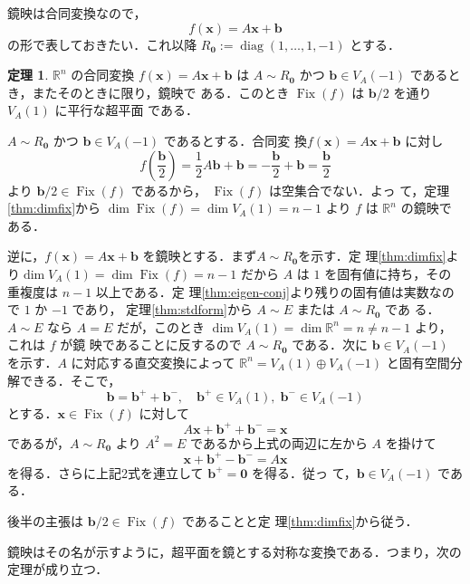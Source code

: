 \documentclass[11pt, uplatex, dvipdfmx, titlepage]{jsarticle}
\makeatletter
\DeclareMathOperator{\Fix}{Fix}
\DeclareMathOperator{\diag}{diag}
\renewenvironment{proof}[1][\proofname]{\par
  \pushQED{\qed}%
  \normalfont \topsep6\p@\@plus6\p@\relax
  \trivlist
  \item[\hskip\labelsep
         \bfseries
    {#1}]\ignorespaces
}{%
  \popQED\endtrivlist\@endpefalse
}
\theoremstyle{definition}
\newtheorem{theorem}{定理}[section]
\renewcommand{\proofname}{\textbf{証明}}
\makeatother
\begin{document}
鏡映は合同変換なので，
\[
  f(\bm{x}) = A\bm{x} + \bm{b}
\]
の形で表しておきたい．これ以降 $R_{\bm{0}} := \diag(1, \ldots, 1, -1)$ とする．

\begin{theorem}\label{thm:refconcrete}
  $\mathbb{R}^n$ の合同変換 $f(\bm{x}) = A\bm{x} + \bm{b}$ は $A \sim
  R_{\bm{0}}$ かつ $\bm{b} \in V_A(-1)$ であるとき，またそのときに限り，鏡映で
  ある．このとき $\Fix(f)$ は $\bm{b}/2$ を通り $V_A(1)$ に平行な超平面
  である．
\end{theorem}

\begin{proof}
  $A\sim R_{\bm{0}}$ かつ $\bm{b} \in V_A(-1)$ であるとする．合同変
  換$f(\bm{x}) = A \bm{x} + \bm{b}$ に対し
  \[
    f\left( \frac{\bm{b}}{2}\right) = \frac{1}{2} A \bm{b} + \bm{b} 
    =-\frac{\bm{b}}{2} + \bm{b} =\frac{\bm{b}}{2} 
  \]
  より $\bm{b}/2 \in \Fix(f)$ であるから， $\Fix(f)$ は空集合でない．よっ
  て，定理\ref{thm:dimfix}から $\dim \Fix(f) = \dim V_A(1) =
  n-1$ より $f$ は $\mathbb{R}^n$ の鏡映である．

  逆に，$f(\bm{x}) = A\bm{x} + \bm{b}$
  を鏡映とする．まず$A \sim R_{\bm{0}}$を示す．定
  理\ref{thm:dimfix}より$\dim V_A(1) = \dim \Fix(f) = n-1$ だから $A$
  は $1$ を固有値に持ち，その重複度は $n-1$ 以上である．定
  理\ref{thm:eigen-conj}より残りの固有値は実数なので $1$ か $-1$ であり，
  定理\ref{thm:stdform}から $A \sim E$ または $A \sim R_{\bm{0}}$ であ
  る．$A \sim E$ なら $A=E$ だが，このとき
  $\dim V_A(1) = \dim \mathbb{R}^n = n \neq n-1$ より，これは $f$ が鏡
  映であることに反するので $A \sim R_{\bm{0}}$ である．次に $\bm{b}
  \in V_A(-1)$ を示す．$A$ に対応する直交変換によって
  $\mathbb{R}^n = V_A(1) \oplus V_A(-1)$ と固有空間分解できる．そこで，
  \[
    \bm{b} = \bm{b}^{+} + \bm{b}^{-}, \quad \bm{b}^{+} \in V_A(1), \; \bm{b}^{-} \in V_A(-1)
  \]
  とする．$\bm{x} \in \Fix(f)$ に対して
  \[
    A\bm{x} + \bm{b}^{+} + \bm{b}^{-} = \bm{x}
  \]
  であるが，$A \sim R_{\bm{0}}$ より $A^2 = E$ であるから上式の両辺に左から $A$ を掛けて
  \[
    \bm{x} + \bm{b}^{+} -\bm{b}^{-} = A\bm{x}
  \]
  を得る．さらに上記2式を連立して $\bm{b}^{+} = \bm{0}$ を得る．従っ
  て，$\bm{b} \in V_A(-1)$ である．

  後半の主張は $\bm{b}/2 \in \Fix(f)$ であることと定
  理\ref{thm:dimfix}から従う．
\end{proof}

\newpage

鏡映はその名が示すように，超平面を鏡とする対称な変換である．つまり，次の定理が成り立つ．
\end{document}
